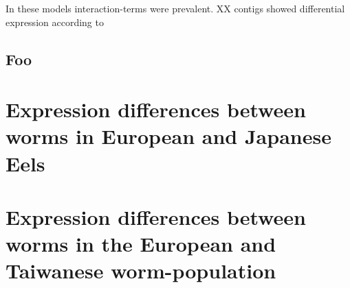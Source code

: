 In these models interaction-terms were prevalent. XX contigs showed
differential expression according to 




\subsection{Foo}

\section{Expression differences between worms in European and Japanese
  Eels}



\section{Expression differences between worms in the European and
  Taiwanese worm-population}





